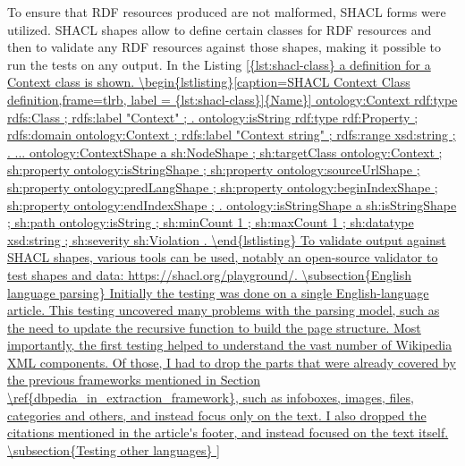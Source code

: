 \documentclass[thesis=M,english,hidelinks]{FITthesis}[2019/12/23]
\begin{document}
To ensure that \gls{RDF} resources produced are not malformed, \gls{SHACL} forms were utilized. \gls{SHACL} shapes allow to define certain classes for \gls{RDF} resources and then to validate any \gls{RDF} resources against those shapes, making it possible to run the tests on any output.
In the Listing \ref{{lst:shacl-class} a definition for a Context class is shown. 
\begin{lstlisting}[caption=SHACL Context Class definition,frame=tlrb,  label = {lst:shacl-class}]{Name}]
ontology:Context
rdf:type rdfs:Class ;
rdfs:label "Context" ;
.

ontology:isString
rdf:type rdf:Property ;
rdfs:domain ontology:Context ;
rdfs:label "Context string" ;
rdfs:range xsd:string ;
.
...
ontology:ContextShape
a sh:NodeShape ;
sh:targetClass ontology:Context ;
sh:property ontology:isStringShape ;
sh:property ontology:sourceUrlShape ;
sh:property ontology:predLangShape ;
sh:property ontology:beginIndexShape ;
sh:property ontology:endIndexShape ;
.

ontology:isStringShape
a sh:isStringShape ;
sh:path ontology:isString ;
sh:minCount 1 ;
sh:maxCount 1 ;
sh:datatype xsd:string ;
sh:severity sh:Violation
.
\end{lstlisting}

To validate output against SHACL shapes, various tools can be used, notably an open-source validator to test shapes and data: https://shacl.org/playground/.

\subsection{English language parsing}

Initially the testing was done on a single English-language article. This testing uncovered many problems with the parsing model, such as the need to update the recursive function to build the page structure. Most importantly, the first testing helped to understand the vast number of Wikipedia XML components. Of those, I had to drop the parts that were already covered by the previous frameworks mentioned in Section \ref{dbpedia_in_extraction_framework}, such as infoboxes, images, files, categories and others, and instead focus only on the text. I also dropped the citations mentioned in the article's footer, and instead focused on the text itself.

\subsection{Testing other languages}

}
\end{document}
